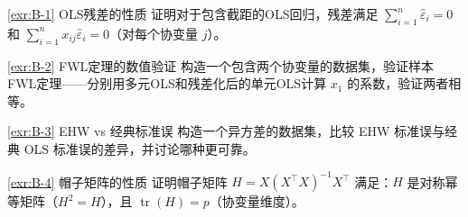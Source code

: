 \begin{Exercise}{\ref{exr:B-1} OLS残差的性质}
证明对于包含截距的OLS回归，残差满足 $\sum_{i=1}^n \hat{\varepsilon}_i = 0$ 和 $\sum_{i=1}^n x_{ij} \hat{\varepsilon}_i = 0$（对每个协变量 $j$）。
\end{Exercise}

\begin{Exercise}{\ref{exr:B-2} FWL定理的数值验证}
构造一个包含两个协变量的数据集，验证样本FWL定理——分别用多元OLS和残差化后的单元OLS计算 $x_1$ 的系数，验证两者相等。
\end{Exercise}

\begin{Exercise}{\ref{exr:B-3} EHW vs 经典标准误}
构造一个异方差的数据集，比较 EHW 标准误与经典 OLS 标准误的差异，并讨论哪种更可靠。
\end{Exercise}

\begin{Exercise}{\ref{exr:B-4} 帽子矩阵的性质}
证明帽子矩阵 $H = X(X^\top X)^{-1} X^\top$ 满足：$H$ 是对称幂等矩阵（$H^2 = H$），且 $\operatorname{tr}(H) = p$（协变量维度）。
\end{Exercise}
